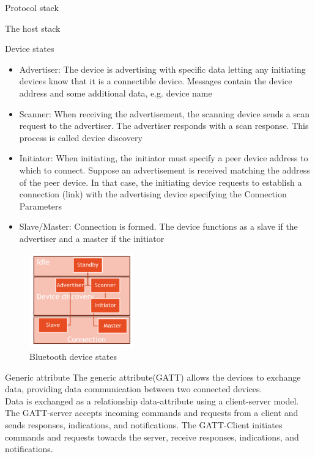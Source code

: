 \begin{section}{Protocol stack}
\begin{subsection}{The host stack}
\begin{subsubsection}{Device states}
\begin{itemize}
      \item Advertiser: The device is advertising with specific data letting any initiating devices
        know that it is a connectible device. Messages contain the device address and some
        additional data, e.g. device name
      \item Scanner: When receiving the advertisement, the scanning device sends a scan request to
        the advertiser. The advertiser responds with a scan response. This process is called device
        discovery
      \item Initiator: When initiating, the initiator must specify a peer device address to which to
        connect. Suppose an advertisement is received matching the address of the peer device. In
        that case, the initiating device requests to establish a connection (link) with the
        advertising device specifying the Connection Parameters
      \item Slave/Master: Connection is formed. The device functions as a slave if the advertiser
        and a master if the initiator
      \end{itemize}
      \begin{figure}[H]
        \centering
        \includegraphics[width=0.4\textwidth]{img/wireless/bluethooth device states.png}
        \caption{Bluetooth device states}
      \end{figure}

    \end{subsubsection}
    \begin{subsubsection}{Generic attribute}
      The generic attribute(GATT) allows the devices to exchange data, providing data communication
      between two connected devices.\\ 
      Data is exchanged as a relationship data-attribute using a client-server model. The GATT-server
      accepts incoming commands and requests from a client and sends responses, indications, and notifications.
      The GATT-Client initiates commands and requests towards the server, receive responses, indications, and notifications.
    \end{subsubsection}


\end{subsection}
\end{section}
